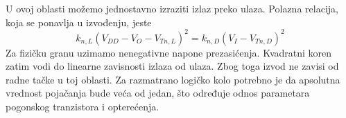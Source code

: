 U ovoj oblasti možemo jednostavno izraziti izlaz preko ulaza. Polazna relacija, koja se ponavlja u izvođenju, jeste
\[k_{n,L}(V_{DD}-V_O-V_{Tn,L})^2=k_{n,D}(V_I-V_{Tn,D})^2\]
Za fizičku granu uzimamo nenegativne napone prezasićenja. Kvadratni koren zatim vodi do linearne zavisnosti izlaza od ulaza. Zbog toga izvod ne zavisi od radne tačke u toj oblasti. Za razmatrano logičko kolo potrebno je da apsolutna vrednost pojačanja bude veća od jedan, što određuje odnos parametara pogonskog tranzistora i opterećenja.
